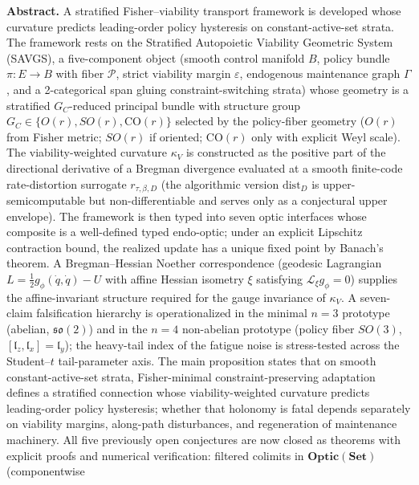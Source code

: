 \documentclass[11pt,a4paper]{article}
\theoremstyle{plain}
\theoremstyle{definition}
\theoremstyle{remark}
\newcommand{\kk}{\kappa_{\!V}}
\newcommand{\CO}{\mathrm{CO}}
\newcommand{\so}{\mathfrak{so}}
\newcommand{\Optic}{\mathbf{Optic}}
\newcommand{\distD}{\mathrm{dist}_{D}}
\begin{document}
\vspace{0.6em}
\begin{center}
\begin{minipage}{0.92\textwidth}
\small
\textbf{Abstract.} A stratified Fisher--viability transport framework
is developed whose curvature predicts leading-order policy hysteresis
on constant-active-set strata. The framework rests on the Stratified
Autopoietic Viability Geometric System (SAVGS), a five-component object
(smooth control manifold $B$, policy bundle $\pi : E \to B$ with fiber
$\mathcal P$, strict viability margin $\varepsilon$, endogenous
maintenance graph $\Gamma$, and a 2-categorical span gluing
constraint-switching strata) whose geometry is a stratified
$G_C$-reduced principal bundle with structure group $G_C \in \{O(r),
SO(r), \CO(r)\}$ selected by the policy-fiber geometry ($O(r)$ from
Fisher metric; $SO(r)$ if oriented; $\CO(r)$ only with explicit Weyl
scale). The viability-weighted curvature $\kk$ is constructed as the
positive part of the directional derivative of a Bregman divergence
evaluated at a smooth finite-code rate-distortion surrogate
$r_{\tau, \beta, D}$ (the algorithmic version $\distD$ is upper-
semicomputable but non-differentiable and serves only as a conjectural
upper envelope). The framework is then typed into seven optic
interfaces whose composite is a well-defined typed endo-optic; under
an explicit Lipschitz contraction bound, the realized update has a
unique fixed point by Banach's theorem. A Bregman--Hessian Noether
correspondence (geodesic Lagrangian $L = \tfrac{1}{2} g_\phi(\dot q,
\dot q) - U$ with affine Hessian isometry $\xi$ satisfying
$\mathcal L_\xi g_\phi = 0$) supplies the affine-invariant structure
required for the gauge invariance of $\kk$. A seven-claim
falsification hierarchy is operationalized in the minimal $n=3$
prototype (abelian, $\so(2)$) and in the $n=4$ non-abelian prototype
(policy fiber $SO(3)$, $[\mathfrak{l}_z, \mathfrak{l}_x] =
\mathfrak{l}_y$); the heavy-tail index of the fatigue noise is
stress-tested across the Student--$t$ tail-parameter axis. The main
proposition states that on smooth constant-active-set strata,
Fisher-minimal constraint-preserving adaptation defines a stratified
connection whose viability-weighted curvature predicts leading-order
policy hysteresis; whether that holonomy is fatal depends separately
on viability margins, along-path disturbances, and regeneration of
maintenance machinery. All five previously open conjectures are now
closed as theorems with explicit proofs and numerical verification:
filtered colimits in $\Optic(\mathbf{Set})$ (componentwise

\end{minipage}
\end{center}
\end{document}
